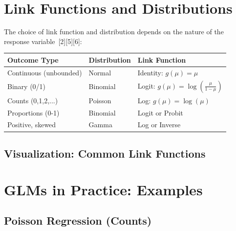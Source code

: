 \documentclass[11pt]{article}
\begin{document}
\section{Link Functions and Distributions}

The choice of link function and distribution depends on the nature of the response variable\ [2][5][6]:

\begin{tabular}{|l|l|l|}
\hline
\textbf{Outcome Type} & \textbf{Distribution} & \textbf{Link Function} \\
\hline
Continuous (unbounded) & Normal & Identity: $g(\mu) = \mu$ \\
Binary (0/1) & Binomial & Logit: $g(\mu) = \log\left(\frac{\mu}{1-\mu}\right)$ \\
Counts (0,1,2,...) & Poisson & Log: $g(\mu) = \log(\mu)$ \\
Proportions (0-1) & Binomial & Logit or Probit \\
Positive, skewed & Gamma & Log or Inverse \\
\hline
\end{tabular}

\subsection*{Visualization: Common Link Functions}
\begin{center}
\end{center}

\section{GLMs in Practice: Examples}

\subsection{Poisson Regression (Counts)}
\end{document}
